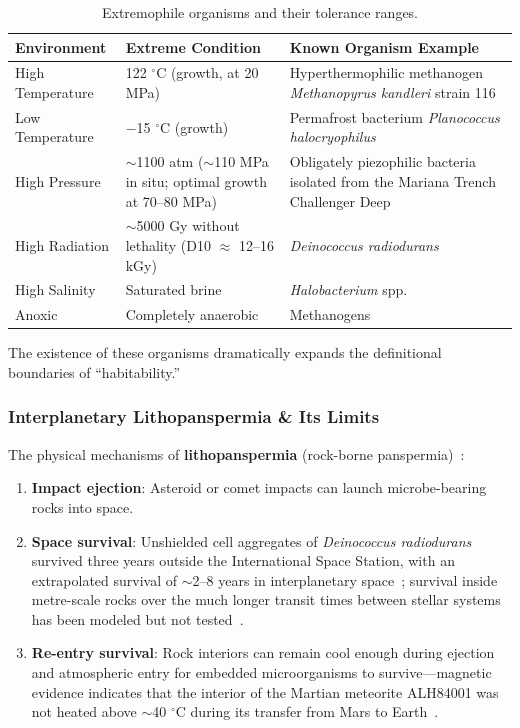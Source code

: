 \documentclass[aps,prd,twocolumn,superscriptaddress,nofootinbib]{revtex4-2}
\begin{document}
\begin{table}[htbp]
\caption{Extremophile organisms and their tolerance ranges.}
\label{tab:extremophiles}
\begin{tabular}{lll}
\toprule
Environment & Extreme Condition & Known Organism Example \\
\midrule
High Temperature & 122 $^{\circ}$C (growth, at 20 MPa) & Hyperthermophilic methanogen \textit{Methanopyrus kandleri} strain 116~\cite{Takai2008} \\
Low Temperature & $-$15 $^{\circ}$C (growth) & Permafrost bacterium \textit{Planococcus halocryophilus}~\cite{Mykytczuk2013} \\
High Pressure & ${\sim}$1100 atm (${\sim}$110 MPa in situ; optimal growth at 70--80 MPa) & Obligately piezophilic bacteria isolated from the Mariana Trench Challenger Deep~\cite{Kato1998} \\
High Radiation & ${\sim}$5000 Gy without lethality (D10 $\approx$ 12--16 kGy) & \textit{Deinococcus radiodurans}~\cite{Slade2011} \\
High Salinity & Saturated brine & \textit{Halobacterium} spp. \\
Anoxic & Completely anaerobic & Methanogens \\
\bottomrule
\end{tabular}
\end{table}

The existence of these organisms dramatically expands the definitional boundaries of ``habitability.''

\subsubsection{Interplanetary Lithopanspermia \& Its Limits}\label{sec:panspermia}

The physical mechanisms of \textbf{lithopanspermia} (rock-borne panspermia)~\cite{Worth2013}:

\begin{enumerate}
  \item \textbf{Impact ejection}: Asteroid or comet impacts can launch microbe-bearing rocks into space.
  \item \textbf{Space survival}: Unshielded cell aggregates of \textit{Deinococcus radiodurans} survived three years outside the International Space Station, with an extrapolated survival of ${\sim}$2--8 years in interplanetary space~\cite{Kawaguchi2020}; survival inside metre-scale rocks over the much longer transit times between stellar systems has been modeled but not tested~\cite{Valtonen2009}.
  \item \textbf{Re-entry survival}: Rock interiors can remain cool enough during ejection and atmospheric entry for embedded microorganisms to survive---magnetic evidence indicates that the interior of the Martian meteorite ALH84001 was not heated above ${\sim}$40 $^{\circ}$C during its transfer from Mars to Earth~\cite{Weiss2000}.
\end{enumerate}
\end{document}
